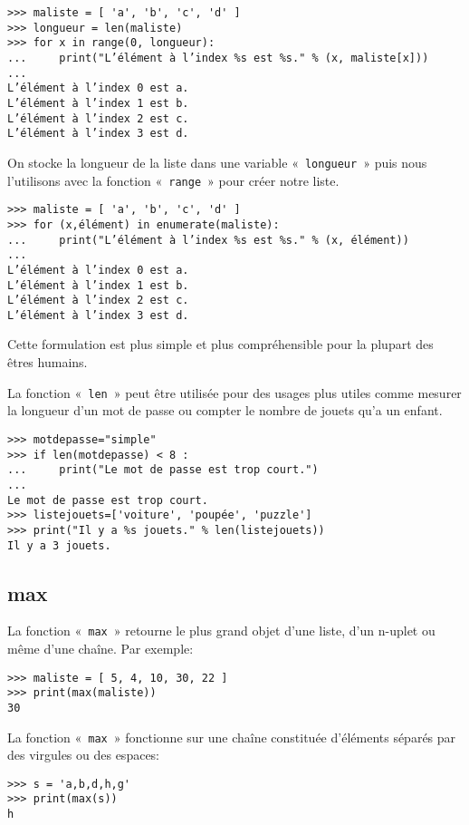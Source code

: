 \begin{Verbatim}[frame=single,rulecolor=\color{gray},label=Très moche!]
>>> maliste = [ 'a', 'b', 'c', 'd' ]
>>> longueur = len(maliste)
>>> for x in range(0, longueur):
...     print("L’élément à l’index %s est %s." % (x, maliste[x]))
... 
L’élément à l’index 0 est a.
L’élément à l’index 1 est b.
L’élément à l’index 2 est c.
L’élément à l’index 3 est d.
\end{Verbatim}

On stocke la longueur de la liste dans une variable «~\texttt{longueur}~» puis nous l'utilisons avec la fonction «~\texttt{range}~» pour créer notre liste.

\begin{Verbatim}[frame=single,rulecolor=\color{green}]
>>> maliste = [ 'a', 'b', 'c', 'd' ]
>>> for (x,élément) in enumerate(maliste):
...     print("L’élément à l’index %s est %s." % (x, élément))
... 
L’élément à l’index 0 est a.
L’élément à l’index 1 est b.
L’élément à l’index 2 est c.
L’élément à l’index 3 est d.
\end{Verbatim}

Cette formulation est plus simple et plus compréhensible pour la plupart des êtres humains.

La fonction «~\texttt{len}~» peut être utilisée pour des usages plus utiles comme mesurer la longueur d'un mot de passe ou compter le nombre de jouets qu'a un enfant.

\begin{Verbatim}[frame=single,rulecolor=\color{gray}]
>>> motdepasse="simple"
>>> if len(motdepasse) < 8 :
...     print("Le mot de passe est trop court.")
...
Le mot de passe est trop court.
>>> listejouets=['voiture', 'poupée', 'puzzle']
>>> print("Il y a %s jouets." % len(listejouets))
Il y a 3 jouets.
\end{Verbatim} 

\subsection*{max}

La fonction «~\texttt{max}~» retourne le plus grand objet d'une liste,  d'un n-uplet ou même d'une chaîne. Par exemple:

\begin{Verbatim}[frame=single,rulecolor=\color{gray}]
>>> maliste = [ 5, 4, 10, 30, 22 ]
>>> print(max(maliste))
30
\end{Verbatim}

La fonction «~\texttt{max}~» fonctionne sur une chaîne constituée d'éléments séparés par des virgules ou des espaces:
\begin{Verbatim}[frame=single,rulecolor=\color{gray}]
>>> s = 'a,b,d,h,g'
>>> print(max(s))
h
\end{Verbatim}

